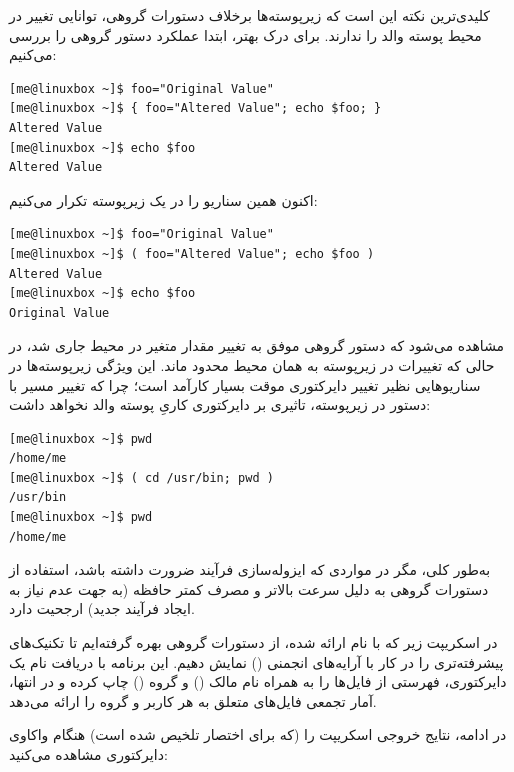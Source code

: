 کلیدی‌ترین نکته این است که زیرپوسته‌ها برخلاف دستورات گروهی، توانایی تغییر در محیط پوسته والد را ندارند. برای درک بهتر، ابتدا عملکرد دستور گروهی را بررسی می‌کنیم:

\begin{latin}
\begin{lstlisting}
[me@linuxbox ~]$ foo="Original Value"
[me@linuxbox ~]$ { foo="Altered Value"; echo $foo; }
Altered Value
[me@linuxbox ~]$ echo $foo
Altered Value
\end{lstlisting}
\end{latin}

اکنون همین سناریو را در یک زیرپوسته تکرار می‌کنیم:

\begin{latin}
\begin{lstlisting}
[me@linuxbox ~]$ foo="Original Value"
[me@linuxbox ~]$ ( foo="Altered Value"; echo $foo )
Altered Value
[me@linuxbox ~]$ echo $foo
Original Value
\end{lstlisting}
\end{latin}

مشاهده می‌شود که دستور گروهی موفق به تغییر مقدار متغیر  در محیط جاری شد، در حالی که تغییرات در زیرپوسته به همان محیط محدود ماند. این ویژگی زیرپوسته‌ها در سناریوهایی نظیر تغییر دایرکتوری موقت بسیار کارآمد است؛ چرا که تغییر مسیر با دستور  در زیرپوسته، تاثیری بر دایرکتوری کاریِ پوسته والد نخواهد داشت:

\begin{latin}
\begin{lstlisting}
[me@linuxbox ~]$ pwd
/home/me
[me@linuxbox ~]$ ( cd /usr/bin; pwd )
/usr/bin
[me@linuxbox ~]$ pwd
/home/me
\end{lstlisting}
\end{latin}

به‌طور کلی، مگر در مواردی که ایزوله‌سازی فرآیند ضرورت داشته باشد، استفاده از دستورات گروهی به دلیل سرعت بالاتر و مصرف کمتر حافظه (به جهت عدم نیاز به ایجاد فرآیند جدید) ارجحیت دارد.

در اسکریپت زیر که با نام  ارائه شده، از دستورات گروهی بهره گرفته‌ایم تا تکنیک‌های پیشرفته‌تری را در کار با آرایه‌های انجمنی () نمایش دهیم. این برنامه با دریافت نام یک دایرکتوری، فهرستی از فایل‌ها را به همراه نام مالک () و گروه () چاپ کرده و در انتها، آمار تجمعی فایل‌های متعلق به هر کاربر و گروه را ارائه می‌دهد.

در ادامه، نتایج خروجی اسکریپت  را (که برای اختصار تلخیص شده است) هنگام واکاوی دایرکتوری  مشاهده می‌کنید:

